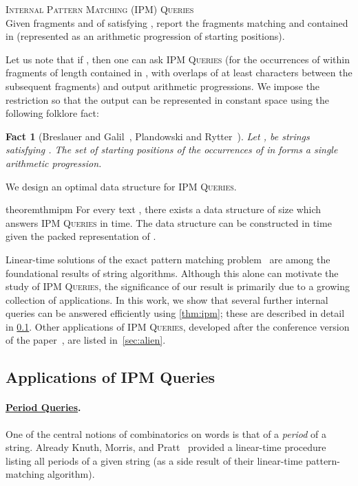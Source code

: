 \documentclass[a4paper]{article}
\newtheorem{fact}[theorem]{Fact}
\theoremstyle{definition}
\theoremstyle{remark}
\newcommand{\IPM}{\textsc{IPM Queries}\xspace}
\newenvironment{dsproblem}[1]
{\begin{center}\begin{lrbox}{\mybox}\begin{minipage}{0.96\columnwidth}{\textsc{#1}}\\}
{\end{minipage}\end{lrbox}\fbox{\usebox{\mybox}}\end{center}}
\newcommand{\defdsproblem}[2]{
  \begin{dsproblem}{#1}
#2
  \end{dsproblem}
  }
\begin{document}
\defdsproblem{\textsc{Internal Pattern Matching (IPM) Queries}}{Given fragments  and  of 
  satisfying , report the fragments matching  and contained in  (represented as an arithmetic progression of starting positions).}
Let us note that if , then one can  ask  \IPM 
(for the occurrences of  within fragments of length  contained in , with overlaps of at least  characters between the subsequent fragments) and output  arithmetic progressions.
We impose the restriction  so that the output can be represented in constant space using the following folklore fact:

\begin{fact}[Breslauer and Galil~\cite{DBLP:journals/algorithmica/BreslauerG95}, Plandowski and Rytter~\cite{DBLP:conf/icalp/PlandowskiR98}]\label{fct:single}
  Let ,  be strings satisfying .
  The set of starting positions of the occurrences of  in  forms a single arithmetic progression.
\end{fact}

We design an optimal data structure for \IPM.

\begin{restatable}{theorem}{thmipm}\label{thm:ipm}
  For every text , there exists a data structure of size  which answers \IPM in  time.  The data structure can be constructed in  time given the packed representation of .
\end{restatable}

Linear-time solutions of the exact pattern matching problem~\cite{morris1970linear,DBLP:journals/siamcomp/KnuthMP77,DBLP:journals/cacm/BoyerM77} are among the foundational results of string algorithms.
Although this alone can motivate the study of \IPM, the significance of our result is primarily due to a growing collection of applications.
In this work, we show that several further internal queries can be answered efficiently using \cref{thm:ipm}; these are described in detail in \cref{subsec:app}.
Other applications of \IPM, developed after the conference version of the paper~\cite{DBLP:conf/soda/KociumakaRRW15}, are listed in~\cref{sec:alien}.

\subsection{Applications of IPM Queries}\label{subsec:app}
\paragraph{\underline{Period Queries}.}
One of the central notions of combinatorics on words is that of a \emph{period} of a string.
Already Knuth, Morris, and Pratt~\cite{morris1970linear,DBLP:journals/siamcomp/KnuthMP77}
provided a linear-time procedure listing all periods of a given string (as a side result of their linear-time pattern-matching algorithm).
\end{document}
